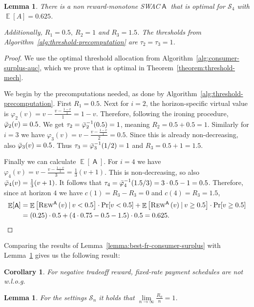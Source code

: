 \documentclass[11pt,letterpaper]{article}
\newcommand{\sqbr}[1]{\left[ #1 \right]}
\newcommand{\rmono}{reward-monotone\xspace}
\newcommand{\fr}{fixed-rate\xspace}
\newcommand{\swac}{SWAC\xspace}
\DeclareMathOperator*{\E}{\bb{E}}
\newcommand{\given}{\medspace | \medspace}
\newcommand{\bb}[1]{\mathbb{#1}}
\DeclareMathOperator{\A}{\auc{A}}
\renewcommand{\S}{\mathcal{S}}
\newcommand{\irn}{\Bar{\varphi}}
\theoremstyle{plain}
\newtheorem{lemma}[theorem]{Lemma}
\newtheorem{corollary}[theorem]{Corollary}
\newcommand{\auc}[1]{\mathsf{#1}}
\begin{document}
\begin{lemma}\label{lemma:consumer_surplus_filter}
    There is a non \rmono \swac $\A$ that is optimal for $\S_4$ with $\E[A]=0.625$.

    Additionally, $R_1=0.5,\ R_2=1$ and $R_3=1.5$. The thresholds from Algorithm~\ref{alg:threshold-precomputation} are $\tau_2=\tau_3=1$.
\end{lemma}
\begin{proof}
We use the optimal threshold allocation from Algorithm~\ref{alg:consumer-surplus-auc}, which we prove that is optimal in Theorem~\ref{theorem:threshold-mech}.

We begin by the precomputations needed, as done by Algorithm~\ref{alg:threshold-precomputation}. First $R_1=0.5$.
Next for $i=2$, the horizon-specific virtual value is 
$\varphi_{2}(v)=v-\frac{v-\frac{1-v}{1}}{1}=1-v$. Therefore, following the ironing procedure, $\irn_{2}(v)=0.5$. We get $\tau_2=\irn_2^{-1}(0.5)=1$, meaning $R_2=0.5+0.5=1$. Similarly for $i=3$ we have $\varphi_{3}(v)=v-\frac{v-\frac{1-v}{1}}{2}=0.5$. Since this is already non-decreasing, also $\irn_3(v)=0.5$. 
Thus $\tau_3=\irn_3^{-1}(1/2)=1$ and $R_3=0.5+1=1.5$.

Finally we can calculate $\E[\A]$. For $i=4$ we have $\varphi_4(v)=v-\frac{v-\frac{1-v}{1}}{3}=\frac{1}{3}(v+1)$. This is non-decreasing, so also $\irn_4(v)=\frac{1}{3}(v+1)$. It follows that $\tau_4=\irn_4^{-1}(1.5/3)=3\cdot0.5-1=0.5$. Therefore, since at horizon $4$ we have $c(1)=R_3-R_3=0$ and $c(4)=R_3=1.5$,
\begin{align*}
    \E[\A]&=\E\sqbr{\trew[\A]{v}\given v<0.5}\cdot\Pr[v<0.5]+\E\sqbr{\trew[\A]{v}\given v\geq0.5}\cdot\Pr[v\geq0.5]\\
    &=(0.25)\cdot0.5+(4\cdot0.75-0.5-1.5)\cdot0.5=0.625.
\end{align*}

\end{proof}

Comparing the results of Lemma~\ref{lemma:best-fr-consumer-surplus} with Lemma~\ref{lemma:consumer_surplus_filter} gives us the following result:
\begin{corollary}\label{cor:neg-tadeoff-fr-not-wlog}
    For negative tradeoff reward, \fr payment schedules are not w.l.o.g.
\end{corollary}

\begin{lemma}\label{lem:best-consumer-surplus-uni}
    For the settings $\S_n$ it holds that $\lim\limits_{n\rightarrow\infty}\frac{R_n}{n}=1$.
\end{lemma}
\end{document}
